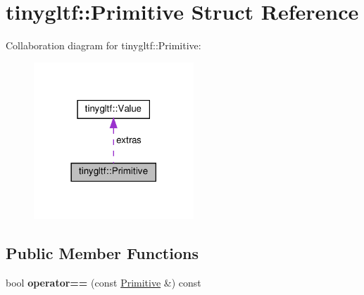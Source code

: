 \hypertarget{structtinygltf_1_1Primitive}{}\section{tinygltf\+:\+:Primitive Struct Reference}
\label{structtinygltf_1_1Primitive}


Collaboration diagram for tinygltf\+:\+:Primitive\+:\nopagebreak
\begin{figure}[H]
\begin{center}
\leavevmode
\includegraphics[width=170pt]{structtinygltf_1_1Primitive__coll__graph}
\end{center}
\end{figure}
\subsection*{Public Member Functions}
\begin{DoxyCompactItemize}
\item 
\mbox{\label{structtinygltf_1_1Primitive_add13973f7d87c7bcd8318809d7b70d28}} 
bool {\bfseries operator==} (const \hyperlink{structtinygltf_1_1Primitive}{Primitive} \&) const
\end{DoxyCompactItemize}
